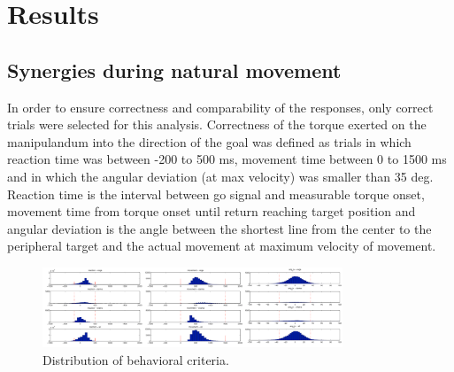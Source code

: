 \chapter{Results} %
\label{sg:cha:results}

\section{Synergies during natural movement} %
\label{sg:sec:nat_mov_syns}


In order to ensure correctness and comparability of the responses, only correct trials were selected for this analysis. Correctness of the torque exerted on the manipulandum into the direction of the goal was defined as trials in which reaction time was between -200 to 500 ms, movement time between 0 to 1500 ms and in which the angular deviation (at max velocity) was smaller than 35 deg. Reaction time is the interval between go signal and measurable torque onset, movement time from torque onset until return reaching target position and angular deviation is the angle between the shortest line from the center to the peripheral target and the actual movement at maximum velocity of movement.
\begin{figure}[ht]
    \centering
        \includegraphics[width=0.8\textwidth]{images/behav_crit.pdf}
    \caption{Distribution of behavioral criteria.}
    \label{sg:fig:images_behav_crit}
\end{figure}


